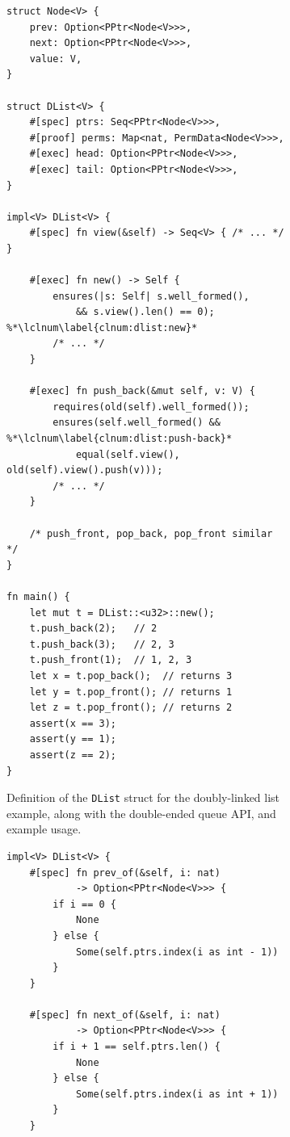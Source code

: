 \begin{figure}

\begin{subfigure}{.48\textwidth}
\begin{lstlisting}[language=Verus,style=VerusLineNos]
struct Node<V> {
    prev: Option<PPtr<Node<V>>>,
    next: Option<PPtr<Node<V>>>,
    value: V,
}

struct DList<V> {
    #[spec] ptrs: Seq<PPtr<Node<V>>>,
    #[proof] perms: Map<nat, PermData<Node<V>>>,
    #[exec] head: Option<PPtr<Node<V>>>,
    #[exec] tail: Option<PPtr<Node<V>>>,
}

impl<V> DList<V> {
    #[spec] fn view(&self) -> Seq<V> { /* ... */ }

    #[exec] fn new() -> Self {
        ensures(|s: Self| s.well_formed(),
            && s.view().len() == 0); %*\lclnum\label{clnum:dlist:new}*
        /* ... */
    }

    #[exec] fn push_back(&mut self, v: V) {
        requires(old(self).well_formed());
        ensures(self.well_formed() && %*\lclnum\label{clnum:dlist:push-back}*
            equal(self.view(), old(self).view().push(v)));
        /* ... */
    }

    /* push_front, pop_back, pop_front similar */
}

fn main() {
    let mut t = DList::<u32>::new();
    t.push_back(2);   // 2
    t.push_back(3);   // 2, 3
    t.push_front(1);  // 1, 2, 3
    let x = t.pop_back();  // returns 3
    let y = t.pop_front(); // returns 1
    let z = t.pop_front(); // returns 2
    assert(x == 3);
    assert(y == 1);
    assert(z == 2);
}
\end{lstlisting}
\caption{Definition of the \texttt{DList} struct for the doubly-linked list example,
        along with the double-ended queue API, and example usage.} \label{fig:dlist:code:defn}
\end{subfigure}\hfill
\begin{subfigure}{.48\textwidth}
\begin{lstlisting}[language=Verus,style=VerusLineNos]
impl<V> DList<V> {
    #[spec] fn prev_of(&self, i: nat)
            -> Option<PPtr<Node<V>>> {
        if i == 0 {
            None
        } else {
            Some(self.ptrs.index(i as int - 1))
        }
    }

    #[spec] fn next_of(&self, i: nat)
            -> Option<PPtr<Node<V>>> {
        if i + 1 == self.ptrs.len() {
            None
        } else {
            Some(self.ptrs.index(i as int + 1))
        }
    }


\end{lstlisting}
\end{subfigure}
\end{figure}
